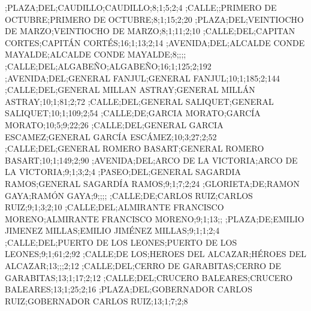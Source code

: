 \begin{tiny}
;PLAZA;DEL;CAUDILLO;CAUDILLO;8;1;5;2;4
;CALLE;;PRIMERO DE OCTUBRE;PRIMERO DE OCTUBRE;8;1;15;2;20
;PLAZA;DEL;VEINTIOCHO DE MARZO;VEINTIOCHO DE MARZO;8;1;11;2;10
;CALLE;DEL;CAPITAN CORTES;CAPITÁN CORTÉS;16;1;13;2;14
;AVENIDA;DEL;ALCALDE CONDE MAYALDE;ALCALDE CONDE MAYALDE;8;;;;
;CALLE;DEL;ALGABEÑO;ALGABEÑO;16;1;125;2;192
;AVENIDA;DEL;GENERAL FANJUL;GENERAL FANJUL;10;1;185;2;144
;CALLE;DEL;GENERAL MILLAN ASTRAY;GENERAL MILLÁN ASTRAY;10;1;81;2;72
;CALLE;DEL;GENERAL SALIQUET;GENERAL SALIQUET;10;1;109;2;54
;CALLE;DE;GARCIA MORATO;GARCÍA MORATO;10;5;9;22;26
;CALLE;DEL;GENERAL GARCIA ESCAMEZ;GENERAL GARCÍA ESCÁMEZ;10;3;27;2;52
;CALLE;DEL;GENERAL ROMERO BASART;GENERAL ROMERO BASART;10;1;149;2;90
;AVENIDA;DEL;ARCO DE LA VICTORIA;ARCO DE LA VICTORIA;9;1;3;2;4
;PASEO;DEL;GENERAL SAGARDIA RAMOS;GENERAL SAGARDÍA RAMOS;9;1;7;2;24
;GLORIETA;DE;RAMON GAYA;RAMÓN GAYA;9;;;;
;CALLE;DE;CARLOS RUIZ;CARLOS RUIZ;9;1;3;2;10
;CALLE;DEL;ALMIRANTE FRANCISCO MORENO;ALMIRANTE FRANCISCO MORENO;9;1;13;;
;PLAZA;DE;EMILIO JIMENEZ MILLAS;EMILIO JIMÉNEZ MILLAS;9;1;1;2;4
;CALLE;DEL;PUERTO DE LOS LEONES;PUERTO DE LOS LEONES;9;1;61;2;92
;CALLE;DE LOS;HEROES DEL ALCAZAR;HÉROES DEL ALCAZAR;13;;;2;12
;CALLE;DEL;CERRO DE GARABITAS;CERRO DE GARABITAS;13;1;17;2;12
;CALLE;DEL;CRUCERO BALEARES;CRUCERO BALEARES;13;1;25;2;16
;PLAZA;DEL;GOBERNADOR CARLOS RUIZ;GOBERNADOR CARLOS RUIZ;13;1;7;2;8

\end{tiny}

